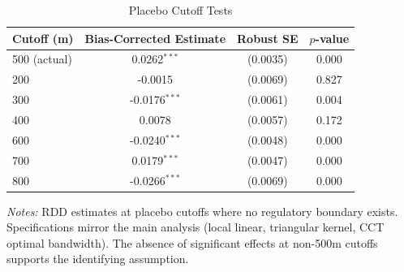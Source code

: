 \begin{table}[t]
\centering
\caption{Placebo Cutoff Tests}
\label{tab:placebo}
\begin{tabular}{lccc}
\toprule
Cutoff (m) & Bias-Corrected Estimate & Robust SE & $p$-value \\
\midrule
500 (actual) & 0.0262$^{***}$ & (0.0035) & 0.000 \\
\midrule
200 & -0.0015 & (0.0069) & 0.827 \\
300 & -0.0176$^{***}$ & (0.0061) & 0.004 \\
400 & 0.0078 & (0.0057) & 0.172 \\
600 & -0.0240$^{***}$ & (0.0048) & 0.000 \\
700 & 0.0179$^{***}$ & (0.0047) & 0.000 \\
800 & -0.0266$^{***}$ & (0.0069) & 0.000 \\
\bottomrule
\end{tabular}
\begin{tablenotes}
\item \textit{Notes:} RDD estimates at placebo cutoffs where no regulatory boundary exists. Specifications mirror the main analysis (local linear, triangular kernel, CCT optimal bandwidth). The absence of significant effects at non-500m cutoffs supports the identifying assumption.
\end{tablenotes}
\end{table}
